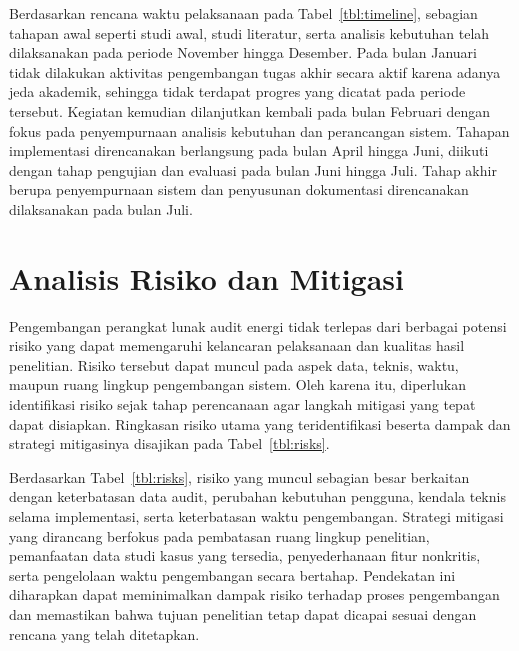 

Berdasarkan rencana waktu pelaksanaan pada Tabel~\ref{tbl:timeline}, sebagian tahapan awal seperti studi awal, studi literatur, serta analisis kebutuhan telah dilaksanakan pada periode November hingga Desember. Pada bulan Januari tidak dilakukan aktivitas pengembangan tugas akhir secara aktif karena adanya jeda akademik, sehingga tidak terdapat progres yang dicatat pada periode tersebut. Kegiatan kemudian dilanjutkan kembali pada bulan Februari dengan fokus pada penyempurnaan analisis kebutuhan dan perancangan sistem. Tahapan implementasi direncanakan berlangsung pada bulan April hingga Juni, diikuti dengan tahap pengujian dan evaluasi pada bulan Juni hingga Juli. Tahap akhir berupa penyempurnaan sistem dan penyusunan dokumentasi direncanakan dilaksanakan pada bulan Juli.

\section{Analisis Risiko dan Mitigasi}
Pengembangan perangkat lunak audit energi tidak terlepas dari berbagai potensi risiko yang dapat memengaruhi kelancaran pelaksanaan dan kualitas hasil penelitian. Risiko tersebut dapat muncul pada aspek data, teknis, waktu, maupun ruang lingkup pengembangan sistem. Oleh karena itu, diperlukan identifikasi risiko sejak tahap perencanaan agar langkah mitigasi yang tepat dapat disiapkan. Ringkasan risiko utama yang teridentifikasi beserta dampak dan strategi mitigasinya disajikan pada Tabel~\ref{tbl:risks}.



Berdasarkan Tabel~\ref{tbl:risks}, risiko yang muncul sebagian besar berkaitan dengan keterbatasan data audit, perubahan kebutuhan pengguna, kendala teknis selama implementasi, serta keterbatasan waktu pengembangan. Strategi mitigasi yang dirancang berfokus pada pembatasan ruang lingkup penelitian, pemanfaatan data studi kasus yang tersedia, penyederhanaan fitur nonkritis, serta pengelolaan waktu pengembangan secara bertahap. Pendekatan ini diharapkan dapat meminimalkan dampak risiko terhadap proses pengembangan dan memastikan bahwa tujuan penelitian tetap dapat dicapai sesuai dengan rencana yang telah ditetapkan.